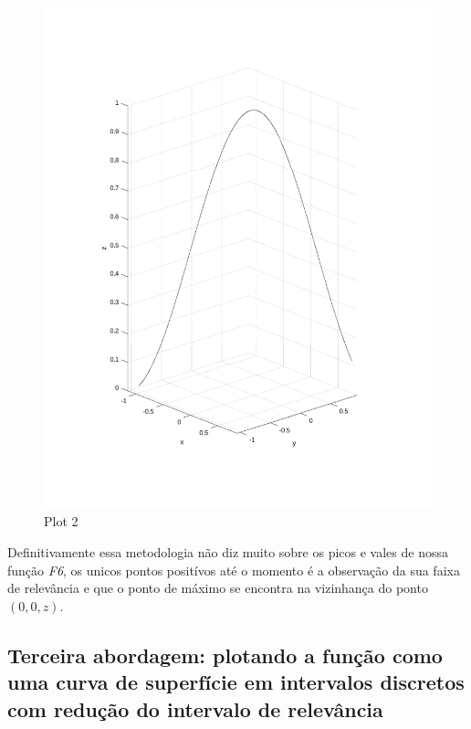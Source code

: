 \documentclass{article}
\begin{document}
\newpage
\begin{figure}[h!]
\centering
\includegraphics[scale=.5]{myplot2.pdf}
\caption{Plot 2}
\label{fig:plot2_f6}
\end{figure}

Definitivamente essa metodologia não diz muito sobre os picos e vales de nossa função \emph{F6}, os unicos pontos positívos até o momento é a observação da sua faixa de relevância e que o ponto de máximo se encontra na vizinhança do ponto $(0,0,z)$.

\subsection*{Terceira abordagem: plotando a função como uma curva de superfície em intervalos discretos com redução do intervalo de relevância}






\end{document}
